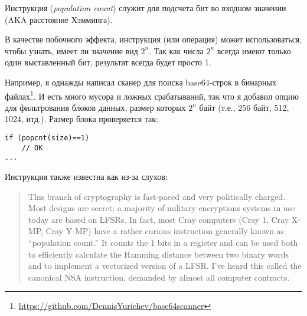 \label{POPCNT}

Инструкция  (\emph{population count}) служит для подсчета бит во входном значении (\ac{AKA} расстояние Хэмминга).

В качестве побочного эффекта, инструкция  (или операция) может использоваться, чтобы узнать,
имеет ли значение вид $2^n$.
Так как числа $2^n$ всегда имеют только один выставленный бит, результат  всегда будет просто 1.

Например, я однажды написал сканер для поиска base64-строк в бинарных файлах\footnote{\url{https://github.com/DennisYurichev/base64scanner}}.
И есть много мусора и ложных срабатываний, так что я добавил опцию для фильтрования блоков данных, размер которых $2^n$ байт
(т.е., 256 байт, 512, 1024, итд.).
Размер блока проверяется так:

\begin{lstlisting}[style=customc]
if (popcnt(size)==1)
	// OK
...
\end{lstlisting}

Инструкция также известна как  из-за слухов:

\begin{framed}
\begin{quotation}
  This branch of cryptography is fast-paced and very politically charged.
  Most designs are secret; a majority of military encryptions systems in use today are 
  based on LFSRs. 
  In fact, most Cray computers (Cray 1, Cray X-MP, Cray Y-MP) have a rather curious 
  instruction generally known as “population count.” It counts the 1 bits in a register 
  and can be used both to efficiently calculate the Hamming distance between two binary 
  words and to implement a vectorized version of a LFSR. I’ve heard this called the canonical 
  NSA instruction, demanded by almost all computer contracts.
\end{quotation}
\end{framed}
\InSqBrackets{\Schneier{}}

